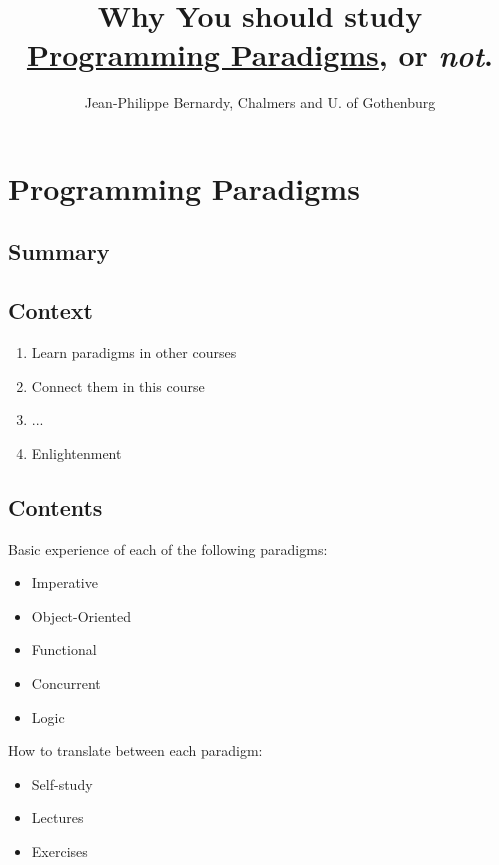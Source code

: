\documentclass[utf8,compress,hyperref]{beamer}
\title[Study Prg. Prd. in SP 3?]{Why You should
  study\\\href{http://www.student.chalmers.se/sp/course?course_code=TDA342}{Programming
    Paradigms}, or \emph{not}.}
\author[JP Bernardy, Chalmers and GU]{Jean-Philippe Bernardy, Chalmers and U. of Gothenburg}
\begin{document}
\section{Programming Paradigms}
\subsection{Summary}
\begin{frame}
\maketitle
\end{frame}

\begin{frame}

\subsection{Context}
\begin{enumerate}
\item Learn paradigms in other courses
\pause
\item Connect them in this course
\pause
\item...
\item Enlightenment

\end{enumerate}

\end{frame}

\subsection{Contents}
\begin{frame}
Basic experience of each of the following paradigms:
  \begin{itemize}
  \item Imperative 
  \item Object-Oriented
  \item Functional
  \item Concurrent
  \item Logic
  \end{itemize}

 How to translate between each paradigm:

\pause 

\begin{itemize}
\item Self-study
\item Lectures
\item Exercises
\end{itemize}

\end{frame}
\end{document}
